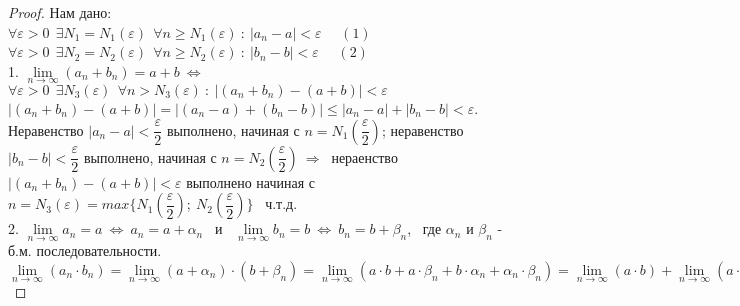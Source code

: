 \documentclass[12pt]{article}
\begin{document}
\begin{proof}
    Нам дано: \\
    $\forall \varepsilon  > 0 \ \ \exists N_1 = N_1(\varepsilon) \ \ \forall n \geq N_1(\varepsilon) \ : \  |a_n - a| < \varepsilon$ \ \ $(1)$ \\
    $\forall \varepsilon  > 0 \ \ \exists N_2 = N_2(\varepsilon) \ \ \forall n \geq N_2(\varepsilon) \ : \  |b_n - b| < \varepsilon$ \ \ $(2)$ \\
        1. $\lim\limits_{n \to \infty} (a_n + b_n) = a + b \ \Leftrightarrow \ $  $\forall \varepsilon > 0 \ \ \exists N_3(\varepsilon) \ \ \forall n > N_3(\varepsilon) \ : \  |(a_n+b_n) - (a + b)| < \varepsilon$ \\
        $|(a_n+b_n) - (a + b)| = |(a_n - a) + (b_n - b)| \leq |a_n - a| + |b_n - b| < \varepsilon$. \\
        Неравенство $|a_n-a| < \dfrac{\varepsilon}{2}$ выполнено, начиная с $n = N_1\left(\dfrac{\varepsilon}{2}\right)$; неравенство  $|b_n-b| < \dfrac{\varepsilon}{2}$ выполнено, начиная с $n = N_2\left(\dfrac{\varepsilon}{2}\right) \ \Rightarrow \ $ нераенство $ |(a_n+b_n) - (a + b)| < \varepsilon$ выполнено начиная с $n = N_3(\varepsilon) = max\{N_1\left(\dfrac{\varepsilon}{2}\right); \ N_2\left(\dfrac{\varepsilon}{2}\right)\}$  \ ч.т.д. \\
        2.  $\lim\limits_{n \to \infty} a_n = a \ \Leftrightarrow \ a_n = a + \alpha_n$ \ и \ $\lim\limits_{n \to \infty} b_n = b \ \Leftrightarrow \ b_n = b + \beta_n$, \ где $\alpha_n$ и $\beta_n$ - б.м. последовательности. \\
        $\lim\limits_{n \to \infty} (a_n \cdot b_n) = \lim\limits_{n \to \infty} (a + \alpha_n) \cdot (b + \beta_n) = \lim\limits_{n \to \infty} (a \cdot b + a \cdot \beta_n + b \cdot \alpha_n + \alpha_n \cdot \beta_n) = \lim\limits_{n \to \infty} (a \cdot b) + \lim\limits_{n \to \infty} (a \cdot \beta_n) + \lim\limits_{n \to \infty} (b \cdot \alpha_n) + \lim\limits_{n \to \infty} (\alpha_n \cdot \beta_n) = a \cdot b + 0 + 0 + 0 = a \cdot b$  
\end{proof}
\end{document}
